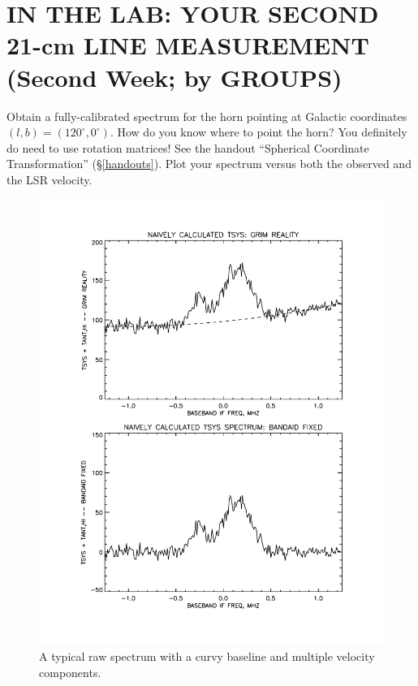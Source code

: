 \documentclass[11pt,preprint]{aastex}
\begin{document}
\section{IN THE LAB: YOUR SECOND 21-cm LINE MEASUREMENT (Second Week; by
  GROUPS)} 
\label{meas2}

Obtain a fully-calibrated spectrum for the horn pointing at Galactic
coordinates $(l,b)=(120^\circ, 0^\circ)$. How do you know where to point
the horn? You definitely do need to use rotation matrices!  See the
handout ``Spherical Coordinate Transformation''
(\S \ref{handouts}). Plot your spectrum versus both the observed and
the LSR velocity. 

\begin{figure}[h!]
\begin{center}
%       
\includegraphics[scale=0.5]{bmp_cal1.pdf}
\end{center}
\vspace{-0.3in}
\caption{\footnotesize A typical raw spectrum with a curvy baseline and
  multiple velocity components. \label{rawspect}}
\end{figure}
\end{document}
